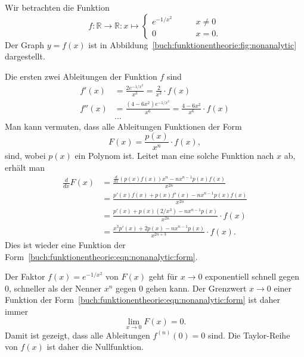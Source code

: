 \begin{beispiel}
\label{buch:funktionentheorie:beispiel:nichtanalytisch}
Wir betrachten die Funktion
\[
f\colon \mathbb{R}\to\mathbb{R}
:
x \mapsto
\begin{cases}
e^{-1/x^2}&\qquad x\ne 0\\
0&\qquad x=0.
\end{cases}
\]
Der Graph $y=f(x)$ ist in Abbildung~\ref{buch:funktionentheorie:fig:nonanalytic}
dargestellt.

Die ersten zwei Ableitungen der Funktion $f$ sind
\begin{align*}
f'(x) &= \frac{2e^{-1/x^2}}{x^3} = \frac{2}{x^3}\cdot f(x)
\\
f''(x) &= \frac{(4-6x^2) e^{-1/x^2}}{x^6} = \frac{4-6x^2}{x^6}\cdot f(x)
\\
&\dots
\end{align*}
Man kann vermuten, dass alle
Ableitungen Funktionen der Form
\begin{equation}
F(x) = \frac{p(x)}{x^n} \cdot f(x),
\label{buch:funktionentheorie:eqn:nonanalytic:form}
\end{equation}
sind,
wobei $p(x)$ ein Polynom ist.
Leitet man eine solche Funktion nach $x$ ab, erhält man
\begin{align*}
\frac{d}{dx} F(x)
&=
\frac{\frac{d}{dx}(p(x)f(x)) x^n - nx^{n-1}p(x)f(x)}{x^{2n}}
\\
&=
\frac{p'(x)f(x) + p(x)f'(x) - nx^{n-1}p(x)f(x)}{x^{2n}} 
\\
&=
\frac{p'(x) + p(x)(2/x^3) - nx^{n-1}p(x)}{x^{2n}} \cdot f(x)
\\
&=
\frac{x^3p'(x)+2p(x)-nx^{n-1}p(x)}{x^{2n+3}}\cdot f(x).
\end{align*}
Dies ist wieder eine Funktion der
Form~\eqref{buch:funktionentheorie:eqn:nonanalytic:form}.

Der Faktor $f(x)=e^{-1/x^2}$ von $F(x)$ geht für $x\to 0$ exponentiell
schnell gegen $0$, schneller als der Nenner $x^n$ gegen $0$ gehen
kann. 
Der Grenzwert $x\to 0$ einer Funktion der 
Form~\eqref{buch:funktionentheorie:eqn:nonanalytic:form}
ist daher immer
\[
\lim_{x\to 0}  F(x) =0.
\]
Damit ist gezeigt, dass alle Ableitungen $f^{(n)}(0)=0$ sind.
Die Taylor-Reihe von $f(x)$ ist daher die Nullfunktion.
\end{beispiel}

%

